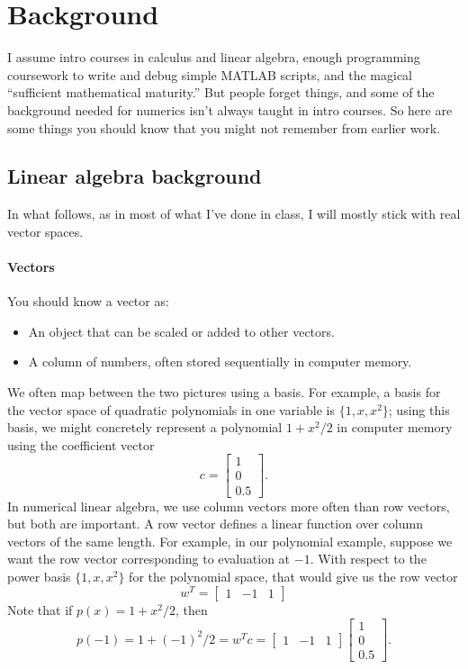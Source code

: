 \documentclass[12pt, leqno]{article}
\begin{document}
\section{Background}

I assume intro courses in calculus and linear algebra, enough
programming coursework to write and debug simple MATLAB scripts, and
the magical ``sufficient mathematical maturity.''  But people
forget things, and some of the background needed for numerics
isn't always taught in intro courses.  So here are some things
you should know that you might not remember from earlier work.

\subsection{Linear algebra background}

In what follows, as in most of what I've done in class, I will mostly
stick with real vector spaces.

\paragraph{Vectors}
You should know a vector as:
\begin{itemize}
\item An object that can be scaled or added to other vectors.
\item A column of numbers, often stored sequentially
  in computer memory.
\end{itemize}
We often map between the two pictures using a basis.  For example,
a basis for the vector space of quadratic polynomials in one variable
is $\{1, x, x^2\}$; using this basis, we might concretely represent a
polynomial $1 + x^2/2$ in computer memory using the coefficient
vector
\[
  c = \begin{bmatrix} 1 \\ 0 \\ 0.5 \end{bmatrix}.
\]
In numerical linear algebra, we use column vectors more often than
row vectors, but both are important.  A row vector defines a linear
function over column vectors of the same length.  For example,
in our polynomial example, suppose we want the row vector
corresponding to evaluation at $-1$.  With respect to the power basis
$\{1, x, x^2\}$ for the polynomial space, that would give us the
row vector
\[
  w^T = \begin{bmatrix} 1 & -1 & 1 \end{bmatrix}
\]
Note that if $p(x) = 1+x^2/2$, then
\[
  p(-1) = 1 + (-1)^2/2
  = w^T c
  = \begin{bmatrix} 1 & -1 & 1 \end{bmatrix}
    \begin{bmatrix} 1 \\ 0 \\ 0.5 \end{bmatrix}.
\]
\end{document}
